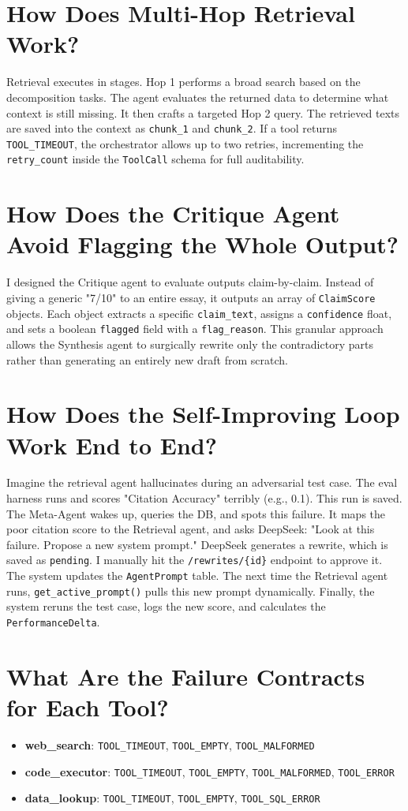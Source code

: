 \documentclass[11pt]{article}
\begin{document}
\section{How Does Multi-Hop Retrieval Work?}
Retrieval executes in stages. Hop 1 performs a broad search based on the decomposition tasks. The agent evaluates the returned data to determine what context is still missing. It then crafts a targeted Hop 2 query. The retrieved texts are saved into the context as \texttt{chunk\_1} and \texttt{chunk\_2}. If a tool returns \texttt{TOOL\_TIMEOUT}, the orchestrator allows up to two retries, incrementing the \texttt{retry\_count} inside the \texttt{ToolCall} schema for full auditability.

\section{How Does the Critique Agent Avoid Flagging the Whole Output?}
I designed the Critique agent to evaluate outputs claim-by-claim. Instead of giving a generic "7/10" to an entire essay, it outputs an array of \texttt{ClaimScore} objects. Each object extracts a specific \texttt{claim\_text}, assigns a \texttt{confidence} float, and sets a boolean \texttt{flagged} field with a \texttt{flag\_reason}. This granular approach allows the Synthesis agent to surgically rewrite only the contradictory parts rather than generating an entirely new draft from scratch.

\section{How Does the Self-Improving Loop Work End to End?}
Imagine the retrieval agent hallucinates during an adversarial test case. The eval harness runs and scores "Citation Accuracy" terribly (e.g., 0.1). This run is saved. The Meta-Agent wakes up, queries the DB, and spots this failure. It maps the poor citation score to the Retrieval agent, and asks DeepSeek: "Look at this failure. Propose a new system prompt." DeepSeek generates a rewrite, which is saved as \texttt{pending}. I manually hit the \texttt{/rewrites/\{id\}} endpoint to approve it. The system updates the \texttt{AgentPrompt} table. The next time the Retrieval agent runs, \texttt{get\_active\_prompt()} pulls this new prompt dynamically. Finally, the system reruns the test case, logs the new score, and calculates the \texttt{PerformanceDelta}.

\section{What Are the Failure Contracts for Each Tool?}
\begin{itemize}
    \item \textbf{web\_search}: \texttt{TOOL\_TIMEOUT}, \texttt{TOOL\_EMPTY}, \texttt{TOOL\_MALFORMED}
    \item \textbf{code\_executor}: \texttt{TOOL\_TIMEOUT}, \texttt{TOOL\_EMPTY}, \texttt{TOOL\_MALFORMED}, \texttt{TOOL\_ERROR}
    \item \textbf{data\_lookup}: \texttt{TOOL\_TIMEOUT}, \texttt{TOOL\_EMPTY}, \texttt{TOOL\_SQL\_ERROR}
\end{itemize}
\end{document}
